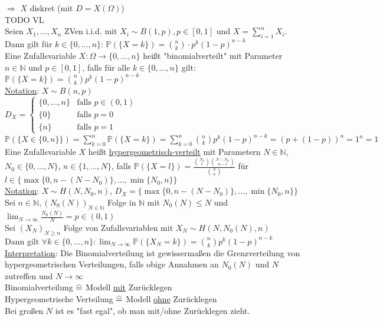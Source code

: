 \documentclass[a4paper]{article}
\renewcommand\hateq{\mathrel{\stackon[1.5pt]{=}{\stretchto{%
				\scalerel*[\widthof{=}]{\wedge}{\rule{1ex}{3ex}}}{0.5ex}}}}
\newcommand{\ul}{\underline}
\begin{document}
$\Rightarrow$ $X$ diskret (mit $D=X(\Omega)$)\\
TODO VL\\
Seien $X_1,\dots,X_n$ ZVen i.i.d. mit $X_i\sim B(1,p),p\in\left[0,1\right]$ und $X=\sum_{i=1}^n X_i$. Dann gilt für $k\in\{0,\dots,n\}$: $\mathbb{P}(\{X=k\})=\binom{n}{k}\cdot p^k(1-p)^{n-k}$\\
Eine Zufallsvariable $X:\Omega\rightarrow\{0,\dots,n\}$ heißt "binomialverteilt" mit Parameter $n\in\mathbb{N}$ und $p\in\left[0,1\right]$, falls für alle $k\in\{0,\dots,n\}$ gilt: $\mathbb{P}(\{X=k\})=\binom{n}{k}p^k(1-p)^{n-k}$\\
\ul{Notation}: $X\sim B(n,p)$\\
$D_X=\begin{cases}
\{0,\dots,n\} & \text{falls }p\in(0,1)\\
\{0\} & \text{falls }p=0\\
\{n\} & \text{falls }p=1
\end{cases}$\\
$\mathbb{P}(\{X\in\{0,n\}\})=\sum_{k=0}^n\mathbb{P}(\{X=k\})=\sum_{k=0}^n\binom{n}{k}p^k(1-p)^{n-k}=(p+(1-p))^n=1^n=1$\\
Eine Zufallsvariable $X$ heißt \ul{hypergeometrisch-verteilt} mit Parametern $N\in\mathbb{N}$, $N_0\in\{0,\dots,N\}$, $n\in\{1,\dots,N\}$, falls $\mathbb{P}(\{X=l\})=\frac{\binom{N_0}{l}\binom{N-N_0}{n-l}}{\binom{N}{n}}$ für $l\in\{\max\{0,n-(N-N_0)\},\dots,\min\{N_0,n\}\}$\\
\ul{Notation}: $X\sim H(N,N_0,n)$, $D_X=\{\max\{0,n-(N-N_0)\},\dots,\min\{N_0,n\}\}$\\
Sei $n\in\mathbb{N}, (N_0(N))_{N\in\mathbb{N}}$ Folge in $\mathbb{N}$ mit $N_0(N)\leq N$ und $\lim_{N\rightarrow\infty}\frac{N_0(N)}{N}=p\in(0,1)$\\
Sei $(X_N)_{N\geq n}$ Folge von Zufallsvariablen mit $X_N\sim H(N,N_0(N),n)$\\
Dann gilt $\forall k\in\{0,\dots,n\}:\lim_{N\rightarrow\infty}\mathbb{P}(\{X_N=k\})=\binom{n}{k}p^k(1-p)^{n-k}$\\
\ul{Interpretation}: Die Binomialverteilung ist gewissermaßen die Grenzverteilung von hypergeometrischen Verteilungen, falls obige Annahmen an $N_0(N)$ und $N$ zutreffen und $N\rightarrow\infty$\\
Binomialverteilung $\hateq$ Modell \ul{mit} Zurücklegen\\
Hypergeometrische Verteilung $\hateq$ Modell \ul{ohne} Zurücklegen\\
Bei großen $N$ ist es "fast egal", ob man mit/ohne Zurücklegen zieht.\\
\end{document}
